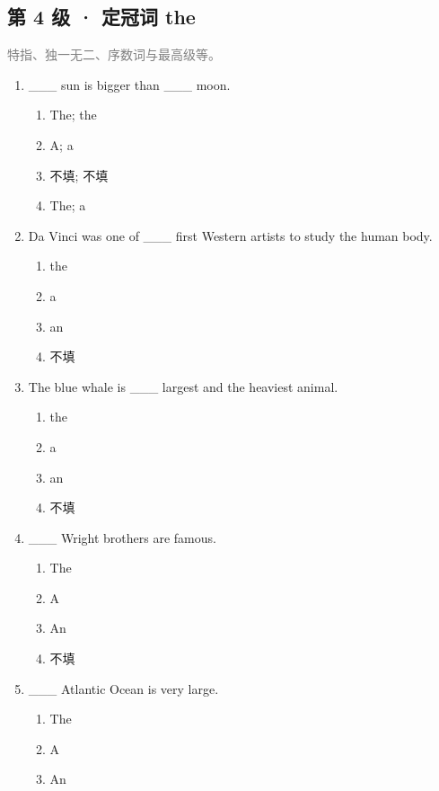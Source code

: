 \documentclass[11pt,a4paper]{ctexart}
\begin{document}
\subsection*{第 4 级 · 定冠词 the}
\noindent\textcolor{gray}{特指、独一无二、序数词与最高级等。}\par\smallskip
\begin{enumerate}[leftmargin=*,itemsep=4pt]
\item \_\_\_ sun is bigger than \_\_\_ moon.
\begin{enumerate}[label=\Alph*.,leftmargin=2em,itemsep=1pt,topsep=2pt]
\item The; the
\item A; a
\item 不填; 不填
\item The; a
\end{enumerate}
\item Da Vinci was one of \_\_\_ first Western artists to study the human body.
\begin{enumerate}[label=\Alph*.,leftmargin=2em,itemsep=1pt,topsep=2pt]
\item the
\item a
\item an
\item 不填
\end{enumerate}
\item The blue whale is \_\_\_ largest and the heaviest animal.
\begin{enumerate}[label=\Alph*.,leftmargin=2em,itemsep=1pt,topsep=2pt]
\item the
\item a
\item an
\item 不填
\end{enumerate}
\item \_\_\_ Wright brothers are famous.
\begin{enumerate}[label=\Alph*.,leftmargin=2em,itemsep=1pt,topsep=2pt]
\item The
\item A
\item An
\item 不填
\end{enumerate}
\item \_\_\_ Atlantic Ocean is very large.
\begin{enumerate}[label=\Alph*.,leftmargin=2em,itemsep=1pt,topsep=2pt]
\item The
\item A
\item An

\end{enumerate}
\end{enumerate}
\end{document}
